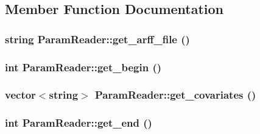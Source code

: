 \subsection{Member Function Documentation}
\hypertarget{classParamReader_a1db0df02a87cf08451a306fe64687dda}{
\subsubsection[{get\_\-arff\_\-file}]{\setlength{\rightskip}{0pt plus 5cm}string ParamReader::get\_\-arff\_\-file ()}}
\label{classParamReader_a1db0df02a87cf08451a306fe64687dda}
\hypertarget{classParamReader_acbc52d902d67738b096a0b41bcf7d61d}{
\subsubsection[{get\_\-begin}]{\setlength{\rightskip}{0pt plus 5cm}int ParamReader::get\_\-begin ()}}
\label{classParamReader_acbc52d902d67738b096a0b41bcf7d61d}
\hypertarget{classParamReader_a24781bbe8138d3c4eedb072ce88f5b95}{
\subsubsection[{get\_\-covariates}]{\setlength{\rightskip}{0pt plus 5cm}vector$<$string$>$ ParamReader::get\_\-covariates ()}}
\label{classParamReader_a24781bbe8138d3c4eedb072ce88f5b95}
\hypertarget{classParamReader_a7f97caf26c9a65a6634b66f27d48f258}{
\subsubsection[{get\_\-end}]{\setlength{\rightskip}{0pt plus 5cm}int ParamReader::get\_\-end ()}}
